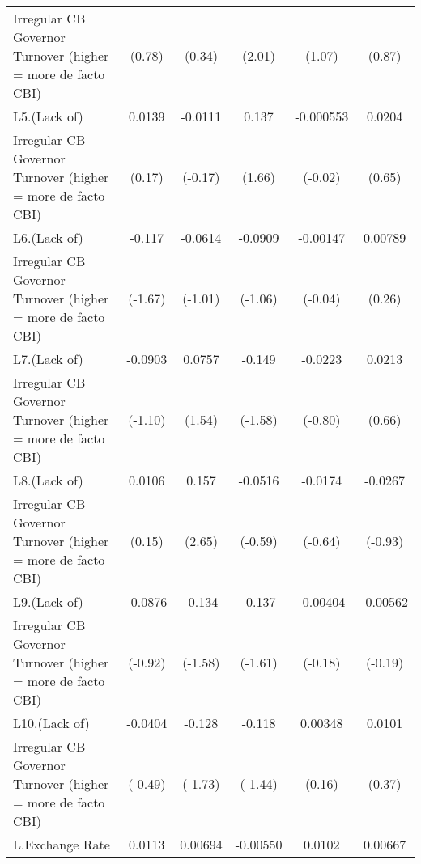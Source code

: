 {\begin{tabular}{l*{5}{c}}
Irregular CB Governor Turnover (higher = more de facto CBI)&      (0.78)         &      (0.34)         &      (2.01)         &      (1.07)         &      (0.87)         \\
[1em]
L5.(Lack of)        &      0.0139         &     -0.0111         &       0.137         &   -0.000553         &      0.0204         \\
Irregular CB Governor Turnover (higher = more de facto CBI)&      (0.17)         &     (-0.17)         &      (1.66)         &     (-0.02)         &      (0.65)         \\
[1em]
L6.(Lack of)        &      -0.117         &     -0.0614         &     -0.0909         &    -0.00147         &     0.00789         \\
Irregular CB Governor Turnover (higher = more de facto CBI)&     (-1.67)         &     (-1.01)         &     (-1.06)         &     (-0.04)         &      (0.26)         \\
[1em]
L7.(Lack of)        &     -0.0903         &      0.0757         &      -0.149         &     -0.0223         &      0.0213         \\
Irregular CB Governor Turnover (higher = more de facto CBI)&     (-1.10)         &      (1.54)         &     (-1.58)         &     (-0.80)         &      (0.66)         \\
[1em]
L8.(Lack of)        &      0.0106         &       0.157\sym{**} &     -0.0516         &     -0.0174         &     -0.0267         \\
Irregular CB Governor Turnover (higher = more de facto CBI)&      (0.15)         &      (2.65)         &     (-0.59)         &     (-0.64)         &     (-0.93)         \\
[1em]
L9.(Lack of)        &     -0.0876         &      -0.134         &      -0.137         &    -0.00404         &    -0.00562         \\
Irregular CB Governor Turnover (higher = more de facto CBI)&     (-0.92)         &     (-1.58)         &     (-1.61)         &     (-0.18)         &     (-0.19)         \\
[1em]
L10.(Lack of)       &     -0.0404         &      -0.128         &      -0.118         &     0.00348         &      0.0101         \\
Irregular CB Governor Turnover (higher = more de facto CBI)&     (-0.49)         &     (-1.73)         &     (-1.44)         &      (0.16)         &      (0.37)         \\
[1em]
L.Exchange Rate     &      0.0113         &     0.00694         &    -0.00550         &      0.0102         &     0.00667\sym{*}  \\

\end{tabular}}
